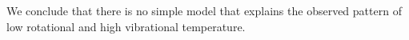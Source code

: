 \documentclass[twocolumn]{aastex62}
\newcommand{\rlp}[1]{\textcolor{blue!65!black}{\textbf{[RLP: #1]}}}
\begin{document}
We conclude that there is no simple model that explains the observed pattern of
low rotational and high vibrational temperature.






\end{document}
